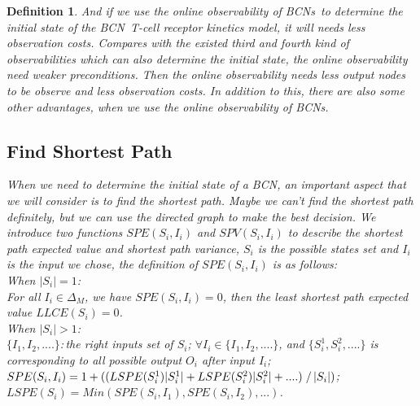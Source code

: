 \documentclass[conference]{IEEEtran} %
\newtheorem{definition}{Definition}
\def \BCN {{\em BCN}}
\def \BCNs {{\em BCNs}}
\begin{document}
\begin{definition}
And if we use the online observability of \BCNs\ to determine the initial state of the \BCN\ T-cell receptor kinetics model, it will needs less observation costs. Compares with the existed third and fourth kind of observabilities which can also determine the initial state, the online observability need weaker preconditions. Then the online observability needs less output nodes to be observe and less observation costs. In addition to this, there are also some other advantages, when we use the online observability of {\em BCNs}.
\subsection{Find Shortest Path}
When we need to determine the initial state of a {\em BCN}, an important aspect that we will consider is to find the shortest path. Maybe we can't find the shortest path definitely, but we can use the directed graph to make the best decision. We introduce two functions $SPE(S_i, I_i)$ and $SPV(S_i, I_i)$ to describe the shortest path expected value and shortest path variance, $S_i$ is the possible states set and $I_i$ is the input we chose, the definition of $SPE(S_i, I_i)$ is as follows:\\
When $|S_i|=1$:\\ 
For all $I_i \in \Delta_M$, we have $SPE(S_i, I_i)=0$, then the least shortest path  expected value $LLCE(S_i)= 0$. \\
When $|S_i|>1$:\\ 
$\{I_1,I_2,....\}$:\,the right inputs set of $S_i$; $\forall I_i \in \{I_1,I_2,....\}$, and $\{S_i^1,S_i^2,....\}$ is corresponding to all possible output $O_i$ after input $I_i$; $SPE(S_i, I_i)=1 +( (LSPE(S_i^1)|S_i^1|+LSPE(S_i^2)|S_i^2|+....)\left. \right/ |S_i|)$; $LSPE(S_i)= Min(SPE(S_i, I_1),SPE(S_i, I_2),...)$.

\end{definition}
\end{document}
